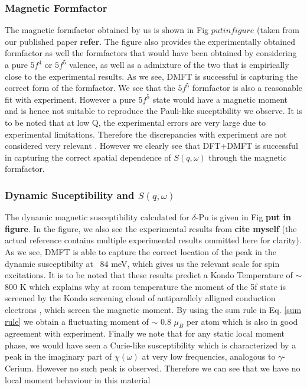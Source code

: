 \documentclass[10pt]{ruthesis}
\begin{document}
{\subsubsection{Magnetic Formfactor}

The magnetic formfactor obtained by us is shown in Fig $ put in figure$ (taken from our published paper \textbf{refer}. The figure also provides the experimentally obtained formfactor as well the formfactors that would have been obtained by considering a pure $5f^4$ or $5f^5$ valence, as well as a admixture of the two that is empirically close to the experimental results. As we see, DMFT is successful is capturing the correct form of the formfactor. We see that the $5f^5$ formfactor is also a reasonable fit with experiment. However a pure $5f^5$ state would have a magnetic moment and is hence not suitable to reproduce the Pauli-like suceptibility we observe. It is to be noted that at low Q, the experimental errors are very large due to experimental limitations. Therefore the discrepancies with experiment are not considered very relevant . However we clearly see that DFT+DMFT is successful in capturing the correct spatial dependence of $S(q,\omega)$ through the magnetic formfactor. 


\subsubsection{Dynamic Suceptibility and $S(q,\omega)$}

The dynamic magnetic susceptibility calculated for $\delta$-Pu is given in Fig \textbf{put in figure}. In the figure, we also see the experimental results from \textbf{cite myself} (the actual reference contains multiple experimental results ommitted here for clarity). As we see, DMFT is able to capture the correct location of the peak in the dynamic susceptibilty at ~84 meV, which gives us the relevant scale for spin excitations. It is to be noted that these results predict a Kondo Temperature of $\sim$800 K  which explains why at room temperature the moment of the 5f state is screened by the Kondo screening cloud of antiparallely alligned conduction electrons , which screen the magnetic moment. By using the sum rule in Eq. \ref{sum rule} we obtain a fluctuating moment of $\sim$ 0.8 $\mu_B$ per atom which is also in good agreement with experiment. Finally we note that for any static local moment phase, we would have seen a Curie-like susceptibility which is characterized by a peak in the imaginary part of $\chi(\omega)$ at very low frequencies, analogous to $\gamma$-Cerium. However no such peak is observed. Therefore we can see that we have no local moment behaviour in this material

}
\end{document}
